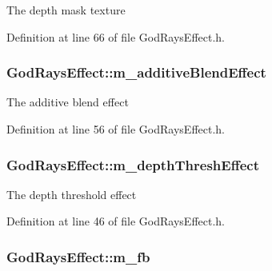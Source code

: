 The depth mask texture 



Definition at line 66 of file God\+Rays\+Effect.\+h.

\subsubsection[{\texorpdfstring{m\+\_\+additive\+Blend\+Effect}{m_additiveBlendEffect}}]{ God\+Rays\+Effect\+::m\+\_\+additive\+Blend\+Effect\hspace{0.3cm}{\ttfamily [private]}}\hypertarget{class_god_rays_effect_abbfb20b6a95e5d766b762ef274b52ff2}{}\label{class_god_rays_effect_abbfb20b6a95e5d766b762ef274b52ff2}


The additive blend effect 



Definition at line 56 of file God\+Rays\+Effect.\+h.

\subsubsection[{\texorpdfstring{m\+\_\+depth\+Thresh\+Effect}{m_depthThreshEffect}}]{ God\+Rays\+Effect\+::m\+\_\+depth\+Thresh\+Effect\hspace{0.3cm}{\ttfamily [private]}}\hypertarget{class_god_rays_effect_a9b389cc1f467514e3d7c71128cbedc94}{}\label{class_god_rays_effect_a9b389cc1f467514e3d7c71128cbedc94}


The depth threshold effect 



Definition at line 46 of file God\+Rays\+Effect.\+h.

\subsubsection[{\texorpdfstring{m\+\_\+fb}{m_fb}}]{ God\+Rays\+Effect\+::m\+\_\+fb\hspace{0.3cm}{\ttfamily [private]}}\hypertarget{class_god_rays_effect_af61e8ec64b9ab0aeaa9aa012c3b9a9fb}{}\label{class_god_rays_effect_af61e8ec64b9ab0aeaa9aa012c3b9a9fb}


